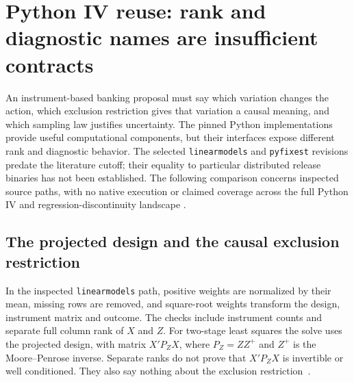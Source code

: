 \section{Python IV reuse: rank and diagnostic names are insufficient contracts}
\label{exec22:pyiv-scope}

An instrument-based banking proposal must say which variation changes the
action, which exclusion restriction gives that variation a causal meaning,
and which sampling law justifies uncertainty. The pinned Python implementations
provide useful computational components, but their interfaces expose different
rank and diagnostic behavior. The selected \texttt{linearmodels} and
\texttt{pyfixest} revisions predate the literature cutoff; their equality to
particular distributed release binaries has not been established. The following
comparison concerns inspected source paths, with no native execution or claimed
coverage across the full Python IV and regression-discontinuity landscape
\citep{exec22_pyiv_kernels_linearmodels,exec22_pyiv_kernels_pyfixest}.

\subsection{The projected design and the causal exclusion restriction}
\label{exec22:pyiv-rank}

In the inspected \texttt{linearmodels} path, positive weights are normalized by
their mean, missing rows are removed, and square-root weights transform the
design, instrument matrix and outcome. The checks include instrument counts
and separate full column rank of $X$ and $Z$. For two-stage least squares the
solve uses the projected design, with matrix $X'P_ZX$, where
$P_Z=ZZ^+$ and $Z^+$ is the Moore--Penrose inverse. Separate ranks do not prove
that $X'P_ZX$ is invertible or well conditioned. They also say nothing about the
exclusion restriction~\citep{exec22_pyiv_kernels_linearmodels}.

